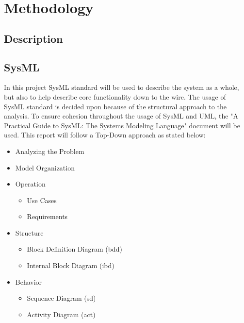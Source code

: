 \section{Methodology}
\subsection{Description}
\noindent{}


\subsection{SysML}
In this project SysML standard will be used to describe the system as a whole, but also to help describe core functionality down to the wire. The usage of SysML standard is decided upon because of the structural approach to the analysis. To ensure cohesion throughout the usage of SysML and UML, the "A Practical Guide to SysML: The Systems Modeling Language"\cite{Friedenthal2014} document will be used. This report will follow a Top-Down approach as stated below:

\begin{itemize}
	\item Analyzing the Problem
	\item Model Organization
	\item Operation
	\begin{itemize}
		\item Use Cases
		\item Requirements
	\end{itemize}
	\item Structure
	\begin{itemize}
		\item Block Definition Diagram (bdd)
		\item Internal Block Diagram (ibd)
	\end{itemize}
	\item Behavior
	\begin{itemize}
		\item Sequence Diagram (sd)
		\item Activity Diagram (act)
	\end{itemize}
\end{itemize}

